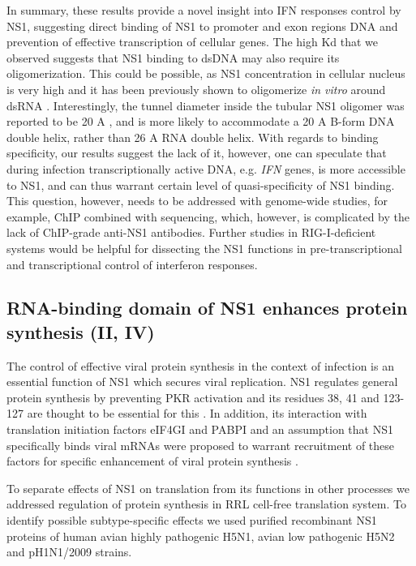 		In summary, these results provide a novel insight into IFN responses control by NS1, suggesting direct binding of NS1 to promoter and exon regions DNA and prevention of effective transcription of cellular genes. The high \gls{Kd} that we observed suggests that NS1 binding to dsDNA may also require its oligomerization. This could be possible, as NS1 concentration in cellular nucleus is very high \parencite{Marazzi2012} and it has been previously shown to oligomerize \textit{in vitro} around dsRNA \parencite{Bornholdt2008}. Interestingly, the tunnel diameter inside the tubular NS1 oligomer was reported to be 20 \gls{A} \parencite{Bornholdt2008}, and is more likely to accommodate a 20 \gls{A} B-form DNA double helix, rather than 26 \gls{A} RNA double helix. With regards to binding specificity, our results suggest the lack of it, however, one can speculate that during infection transcriptionally active DNA, e.g. \textit{IFN} genes, is more accessible to NS1, and can thus warrant certain level of quasi-specificity of NS1 binding. This question, however, needs to be addressed with genome-wide studies, for example, \gls{ChIP} combined with sequencing, which, however, is complicated by the lack of \gls{ChIP}-grade anti-NS1 antibodies. Further studies in \gls{RIG-I}-deficient systems would be helpful for dissecting the NS1 functions in pre-transcriptional and transcriptional control of interferon responses. 								
						
	\subsection{RNA-binding domain of NS1 enhances protein synthesis  (II, IV)}
	
		The control of effective viral protein synthesis in the context of infection is an essential function of \gls{NS1} which secures viral replication. NS1 regulates general protein synthesis by preventing  \gls{PKR} activation and its residues 38, 41 and 123-127 are thought to be essential for this \parencite{Lu1995, Min2007}. In addition, its interaction with translation initiation factors \gls{eIF4GI} and \gls{PABP}I and an assumption that NS1 specifically binds viral mRNAs were proposed to warrant recruitment of these factors for specific enhancement of viral protein synthesis \parencite{DelaLuna1995, Aragon2000, Burgui2003}. 
		
		To separate effects of NS1 on translation from its functions in other processes we addressed regulation of protein synthesis in \gls{RRL} cell-free translation system. To identify possible subtype-specific effects we used purified recombinant NS1 proteins of human avian highly pathogenic H5N1, avian low pathogenic H5N2 and pH1N1/2009 strains. 
		
